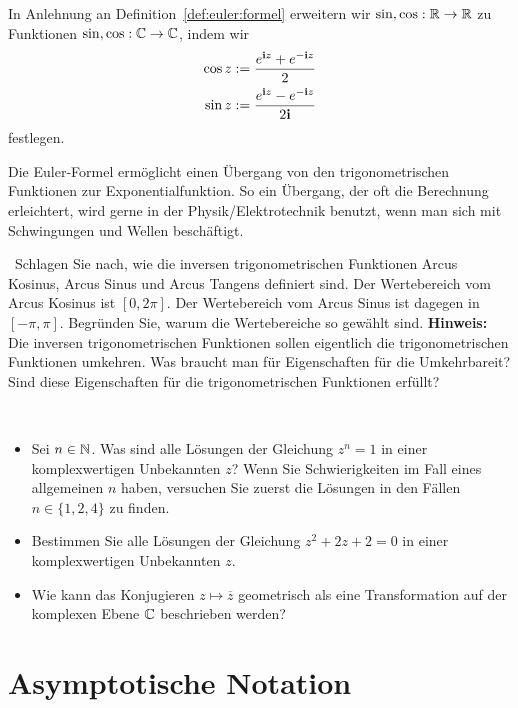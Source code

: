 \begin{defn} 
	In Anlehnung an Definition~\ref{def:euler:formel} erweitern wir $\sin, \cos : \mathbb{R} \to \mathbb{R}$ zu Funktionen $\sin, \cos : \mathbb{C} \to \mathbb{C}$, indem wir 
	\begin{align*}
			\cos z  & : = \frac{e^{\mathbf{i} z} + e^{-\mathbf{i} z}}{2}
			\\ \sin z & := \frac{e^{\mathbf{i} z } - e^{ -\mathbf{i} z}}{2 \mathbf{i}}
	\end{align*} 
	festlegen. 
\end{defn} 

\begin{bem}
	Die Euler-Formel ermöglicht einen Übergang von den trigonometrischen Funktionen zur Exponentialfunktion. So ein Übergang, der oft die Berechnung  erleichtert, wird gerne in der Physik/Elektrotechnik benutzt, wenn man sich mit Schwingungen und Wellen beschäftigt. 
\end{bem} 

\begin{aufg}\ 
	Schlagen Sie nach, wie die inversen trigonometrischen Funktionen Arcus Kosinus, Arcus Sinus und Arcus Tangens definiert sind. Der Wertebereich  vom Arcus Kosinus ist $[0,2\pi]$. Der Wertebereich vom Arcus Sinus ist dagegen in $[-\pi,\pi]$. Begründen Sie, warum die Wertebereiche so gewählt sind. \textbf{Hinweis:} Die inversen trigonometrischen Funktionen sollen eigentlich die trigonometrischen Funktionen umkehren. Was braucht man für Eigenschaften für die Umkehrbareit? Sind diese Eigenschaften für die trigonometrischen Funktionen erfüllt? 
\end{aufg} 

\begin{aufg}\
	\begin{itemize}
			\item Sei $n \in \mathbb{N}$. Was sind alle Lösungen der Gleichung $z^n =1$ in einer komplexwertigen Unbekannten $z$? Wenn Sie Schwierigkeiten im Fall eines allgemeinen $n$ haben, versuchen Sie zuerst die Lösungen in den Fällen $n \in \{1,2,4\}$ zu finden. 
			\item Bestimmen Sie alle Lösungen der Gleichung $z^2 + 2 z +  2 = 0$ in einer komplexwertigen Unbekannten $z$. 
			\item Wie kann das Konjugieren $z \mapsto \overline{z}$ geometrisch als eine Transformation  auf der komplexen Ebene $\mathbb{C}$ beschrieben werden? 
	\end{itemize} 
\end{aufg} 


\section{Asymptotische Notation}

